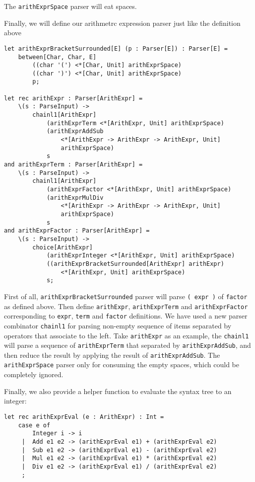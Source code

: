 The \texttt{arithExprSpace} parser will eat spaces.

Finally, we will define our arithmetrc expression parser just like the definition above

\begin{lstlisting}
let arithExprBracketSurrounded[E] (p : Parser[E]) : Parser[E] =
    between[Char, Char, E]
        ((char '(') <*[Char, Unit] arithExprSpace)
        ((char ')') <*[Char, Unit] arithExprSpace)
        p;

let rec arithExpr : Parser[ArithExpr] =
    \(s : ParseInput) ->
        chainl1[ArithExpr]
            (arithExprTerm <*[ArithExpr, Unit] arithExprSpace)
            (arithExprAddSub
                <*[ArithExpr -> ArithExpr -> ArithExpr, Unit]
                arithExprSpace)
            s
and arithExprTerm : Parser[ArithExpr] =
    \(s : ParseInput) ->
        chainl1[ArithExpr]
            (arithExprFactor <*[ArithExpr, Unit] arithExprSpace)
            (arithExprMulDiv
                <*[ArithExpr -> ArithExpr -> ArithExpr, Unit]
                arithExprSpace)
            s
and arithExprFactor : Parser[ArithExpr] =
    \(s : ParseInput) ->
        choice[ArithExpr]
            (arithExprInteger <*[ArithExpr, Unit] arithExprSpace)
            ((arithExprBracketSurrounded[ArithExpr] arithExpr)
                <*[ArithExpr, Unit] arithExprSpace)
            s;
\end{lstlisting}

First of all, \texttt{arithExprBracketSurrounded} parser will parse \texttt{( expr )} of \texttt{factor} as defined above. Then define \texttt{arithExpr}, \texttt{arithExprTerm} and \texttt{arithExprFactor} corresponding to \texttt{expr}, \texttt{term} and \texttt{factor} definitions. We have used a new parser combinator \texttt{chainl1} for parsing non-empty sequence of items separated by operators that associate to the left. Take \texttt{arithExpr} as an example, the \texttt{chainl1} will parse a sequence of \texttt{arithExprTerm} that separated by \texttt{arithExprAddSub}, and then reduce the result by applying the result of \texttt{arithExprAddSub}. The \texttt{arithExprSpace} parser only for consuming the empty spaces, which could be completely ignored.

Finally, we also provide a helper function to evaluate the syntax tree to an integer:

\begin{lstlisting}
let rec arithExprEval (e : ArithExpr) : Int =
    case e of
        Integer i -> i
     |  Add e1 e2 -> (arithExprEval e1) + (arithExprEval e2)
     |  Sub e1 e2 -> (arithExprEval e1) - (arithExprEval e2)
     |  Mul e1 e2 -> (arithExprEval e1) * (arithExprEval e2)
     |  Div e1 e2 -> (arithExprEval e1) / (arithExprEval e2)
     ;
\end{lstlisting}

